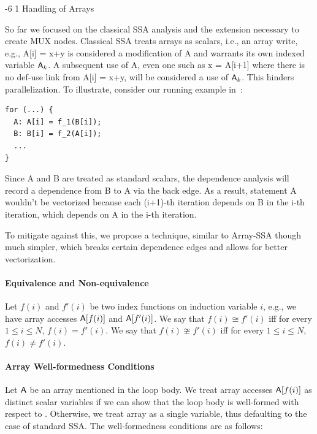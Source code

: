 \documentclass[sigconf, screen, natbib=false, dvipsnames, table]{acmart}
\makeatletter
\renewcommand{\subsubsection}{\@startsection{subsubsection}{3}{\z@}%
                        {-6\p@ \@plus -4\p@ \@minus -4\p@}%
                        {1\p@ \@plus 1\p@ \@minus 0\p@}%
                        {\normalfont\normalsize\bfseries\boldmath}}
\theoremstyle{definition}
\makeatother
\begin{document}
\subsubsection{Handling of Arrays}
\label{???}

So far we focused on the classical SSA analysis and the extension necessary to create MUX nodes. 
Classical SSA treats arrays as scalars, i.e., an array write, e.g., {\sf A[i] = x+y} is considered
a modification of {\sf A} and warrants its own indexed variable ${\sf A}_k$. A subsequent use of {\sf A}, 
even one such as {\sf x = A[i+1]} where there is no def-use link from {\sf A[i] = x+y}, will be 
considered a use of ${\sf A}_k$. This hinders parallelization. To illustrate, consider our running
example in~:
\begin{verbatim}
for (...) {
  A: A[i] = f_1(B[i]);
  B: B[i] = f_2(A[i]);
  ...
}
\end{verbatim}
Since {\sf A} and {\sf B} are treated as standard scalars, the dependence analysis will record
a dependence from {\sf B} to {\sf A} via the back edge. As a result, statement {\sf A} wouldn't 
be vectorized because each (i+1)-th iteration depends on {\sf B} in the i-th iteration,
which depends on {\sf A} in the i-th iteration. 

To mitigate against this, we propose a technique, similar to Array-SSA though much simpler, 
which breaks certain dependence edges and allows for better vectorization. 


\paragraph {Equivalence and Non-equivalence} Let $f(i)$ and $f'(i)$ be two index functions on induction variable $i$, 
e.g., we have array accesses ${{\sf A}}[f(i)]$ and ${{\sf A}}[f'(i)]$. We say that $f(i) \cong f'(i)$ iff for every $1 \le i \le N$,
$f(i) = f'(i)$. We say that $f(i) \ncong f'(i)$ iff for every $1 \le i \le N$, $f(i) \neq f'(i)$. 


\paragraph{Array Well-formedness Conditions} Let ${{\sf A}}$ be an array mentioned in the loop body. 
We treat array accesses ${{\sf A}}[f(i)]$ as distinct scalar variables if we can show that the loop body is
well-formed with respect to \A. Otherwise, we treat array {\A} as a single variable, thus defaulting to the 
case of standard SSA. The well-formedness conditions are as follows: 
\end{document}

